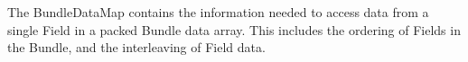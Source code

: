 
The BundleDataMap contains the information needed to access data 
from a single Field in a packed Bundle data array.
This includes the ordering of Fields in the Bundle,
and the interleaving of Field data.


